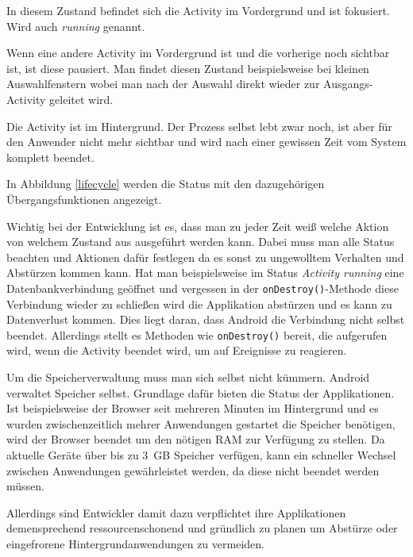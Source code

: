\begin{description}[style=nextline]
	\item[Resumed] In diesem Zustand befindet sich die Activity im Vordergrund und ist fokusiert. Wird auch \emph{running} genannt.
	\item[Paused] Wenn eine andere Activity im Vordergrund ist und die vorherige noch sichtbar ist, ist diese pausiert. Man findet diesen Zustand beispielsweise bei kleinen Auswahlfenstern wobei man nach der Auswahl direkt wieder zur Ausgangs-Activity geleitet wird.
	\item[Stopped] Die Activity ist im Hintergrund. Der Prozess selbst lebt zwar noch, ist aber für den Anwender nicht mehr sichtbar und wird nach einer gewissen Zeit vom System komplett beendet. 
\end{description}

In Abbildung \ref{lifecycle} werden die Status mit den dazugehörigen Übergangsfunktionen angezeigt.

Wichtig bei der Entwicklung ist es, dass man zu jeder Zeit weiß welche Aktion von welchem Zustand aus ausgeführt werden kann. Dabei muss man alle Status beachten und Aktionen dafür festlegen da es sonst zu ungewolltem Verhalten und Abstürzen kommen kann. Hat man beispielsweise im Status \emph{Activity running} eine Datenbankverbindung geöffnet und vergessen in der \verb+onDestroy()+-Methode diese Verbindung wieder zu schließen wird die Applikation abstürzen und es kann zu Datenverlust kommen. Dies liegt daran, dass Android die Verbindung nicht selbst beendet. Allerdings stellt es Methoden wie \verb+onDestroy()+ bereit, die aufgerufen wird, wenn die Activity beendet wird, um auf Ereignisse zu reagieren.

Um die Speicherverwaltung muss man sich selbst nicht kümmern. Android verwaltet Speicher selbst. Grundlage dafür bieten die Status der Applikationen. Ist beispielsweise der Browser seit mehreren Minuten im Hintergrund und es wurden zwischenzeitlich mehrer Anwendungen gestartet die Speicher benötigen, wird der Browser beendet um den nötigen RAM zur Verfügung zu stellen. Da aktuelle Geräte über bis zu \SI{3}{GB} Speicher verfügen, kann ein schneller Wechsel zwischen Anwendungen gewährleistet werden, da diese nicht beendet werden müssen.

Allerdings sind Entwickler damit dazu verpflichtet ihre Applikationen demensprechend ressourcenschonend und gründlich zu planen um Abstürze oder eingefrorene Hintergrundanwendungen zu vermeiden.
